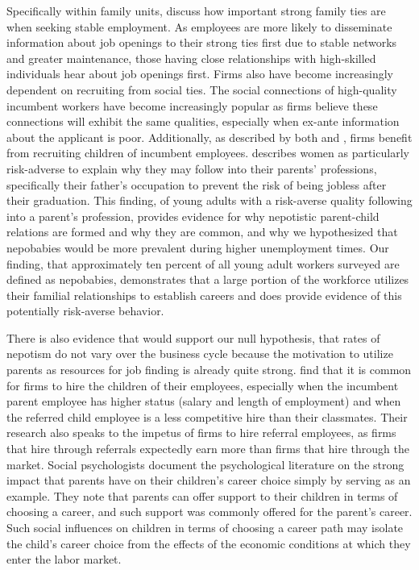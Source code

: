 \documentclass[12pt]{article}
\begin{document}
Specifically within family units, \cite{kramarz_when_2014} discuss how important strong family ties are when seeking stable employment. As employees are more likely to disseminate information about job openings to their strong ties first due to stable networks and greater maintenance, those having close relationships with high-skilled individuals hear about job openings first. Firms also have become increasingly dependent on recruiting from social ties. The social connections of high-quality incumbent workers have become increasingly popular as firms believe these connections will exhibit the same qualities, especially when ex-ante information about the applicant is poor. Additionally, as described by both \cite{kramarz_when_2014} and \cite{hellerstein_dads_2011}, firms benefit from recruiting children of incumbent employees. \cite{hellerstein_dads_2011} describes women as particularly risk-adverse to explain why they may follow into their parents' professions, specifically their father’s occupation to prevent the risk of being jobless after their graduation. This finding, of young adults with a risk-averse quality following into a parent's profession, provides evidence for why nepotistic parent-child relations are formed and why they are common, and why we hypothesized that nepobabies would be more prevalent during higher unemployment times. Our finding, that approximately ten percent of all young adult workers surveyed are defined as nepobabies, demonstrates that a large portion of the workforce utilizes their familial relationships to establish careers and does provide evidence of this potentially risk-averse behavior.

There is also evidence that would support our null hypothesis, that rates of nepotism do not vary over the business cycle because the motivation to utilize parents as resources for job finding is already quite strong. \cite{kramarz2006nepotism} find that it is common for firms to hire the children of their employees, especially when the incumbent parent employee has higher status (salary and length of employment) and when the referred child employee is a less competitive hire than their classmates. Their research also speaks to the impetus of firms to hire referral employees, as firms that hire through referrals expectedly earn more than firms that hire through the market. Social psychologists \cite{vanhooft_nepotism_2011} document the psychological literature on the strong impact that parents have on their children's career choice simply by serving as an example. They note that parents can offer support to their children in terms of choosing a career, and such support was commonly offered for the parent's career. Such social influences on children in terms of choosing a career path may isolate the child's career choice from the effects of the economic conditions at which they enter the labor market.
\end{document}
